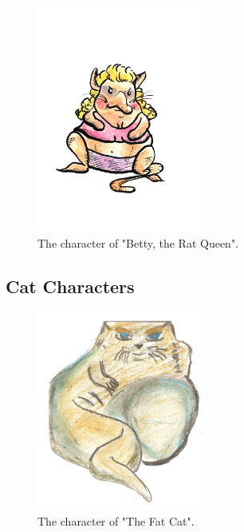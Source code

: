 \documentclass[12pt]{IEEEtran}
\begin{document}
	\begin{figure}[h]
		\centering
		\includegraphics[width=0.5\textwidth]{Rat_Betty.jpg}
		\caption{The character of "Betty, the Rat Queen".}
		\label{fig:betty}
	\end{figure}
	
\subsection{Cat Characters}
\label{subsec:catcharacters}

	\begin{figure}[h]
		\centering
		\includegraphics[width=0.5\textwidth]{fat_cat.jpg}
		\caption{The character of "The Fat Cat".}
		\label{fig:fat}
	\end{figure}
\end{document}
